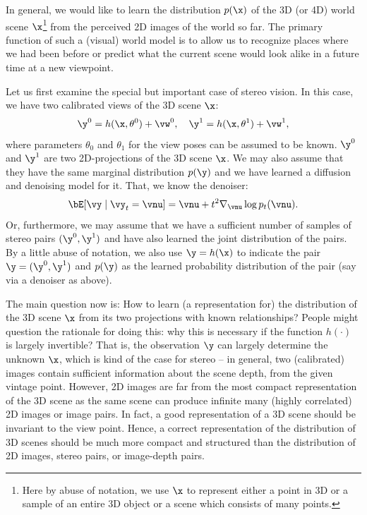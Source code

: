 \documentclass[../../book-main.tex]{subfiles}
\begin{document}
In general, we would like to learn the distribution $p(\x)$ of the 3D (or 4D) world scene $\x$\footnote{Here by abuse of notation, we use $\x$ to represent either a point in 3D or a sample of an entire 3D object or a scene which consists of many points.} from the perceived 2D images of the world so far. The primary function of such a (visual) world model is to allow us to recognize places where we had been before or predict what the current scene would look alike in a future time at a new viewpoint. 

Let us first examine the special but important case of stereo vision. In this case, we have two calibrated views of the 3D scene $\x$:
\begin{equation}
    \y^0 = h(\x, \theta^0) +\vw^0, \quad \y^1 = h(\x, \theta^1) +\vw^1, 
\end{equation}
where parameters $\theta_0$ and $\theta_1$ for the view poses can be assumed to be known. $\y^0$ and $\y^1$ are two 2D-projections of the 3D scene $\x$. We may also assume that they have the same marginal distribution $p(\y)$ and we have learned a diffusion and denoising model for it. That, we know the denoiser:
\begin{equation}
  \bE[\vy \mid \vy_t=\vnu] =
  \vnu + t^2 \nabla_{\vnu}\log p_t(\vnu). 
 \label{eq:y-posterior-sampling-denoiser}    
\end{equation}
Or, furthermore, we may assume that we have a sufficient number of samples of stereo pairs $(\y^0, \y^1)$ and have also learned the joint distribution of the pairs. By a little abuse of notation, we also use $\y = h(\x)$ to indicate the pair $\y = (\y^0, \y^1)$ and $p(\y)$ as the learned probability distribution of the pair (say via a denoiser as above).  

The main question now is: How to learn (a representation for) the distribution of the 3D scene $\x$ from its two projections with known relationships? 
People might question the rationale for doing this: why this is necessary if the function $h(\cdot)$ is largely invertible? That is, the observation $\y$ can largely determine the unknown $\x$, which is kind of the case for stereo -- in general, two (calibrated) images contain sufficient information about the scene depth, from the given vintage point. However, 2D images are far from the most compact representation of the 3D scene as the same scene can produce infinite many (highly correlated) 2D images or image pairs. In fact, a good representation of a 3D scene should be invariant to the view point. Hence, a correct representation of the distribution of 3D scenes should be much more compact and structured than the distribution of 2D images, stereo pairs, or image-depth pairs. 
\end{document}
